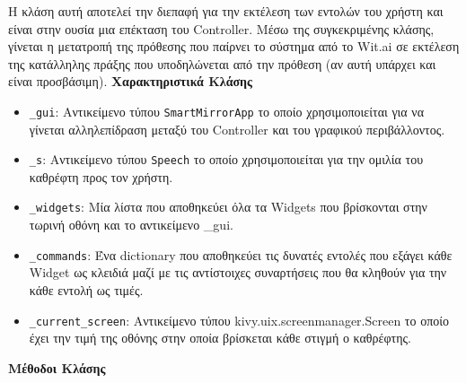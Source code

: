 Η κλάση αυτή αποτελεί την διεπαφή για την εκτέλεση των εντολών του χρήστη και είναι στην ουσία μια επέκταση του Controller. Μέσω της συγκεκριμένης κλάσης, γίνεται η μετατροπή της πρόθεσης που παίρνει το σύστημα από το Wit.ai σε εκτέλεση της κατάλληλης πράξης που υποδηλώνεται από την πρόθεση (αν αυτή υπάρχει και είναι προσβάσιμη).
\newpage
\noindent\textbf{Χαρακτηριστικά Κλάσης}
\begin{itemize}
    \item \texttt{\_gui}: Αντικείμενο τύπου \texttt{SmartMirrorApp} το οποίο χρησιμοποιείται για να γίνεται αλληλεπίδραση μεταξύ του Controller και του γραφικού περιβάλλοντος.
    \item \texttt{\_s}: Αντικείμενο τύπου \texttt{Speech} το οποίο χρησιμοποιείται για την ομιλία του καθρέφτη προς τον χρήστη.
    \item \texttt{\_widgets}: Μία λίστα που αποθηκεύει όλα τα Widgets που βρίσκονται στην τωρινή οθόνη και το αντικείμενο \_gui.
    \item \texttt{\_commands}: Ένα dictionary που αποθηκεύει τις δυνατές εντολές που εξάγει κάθε Widget ως κλειδιά μαζί με τις αντίστοιχες συναρτήσεις που θα κληθούν για την κάθε εντολή ως τιμές.
    \item \texttt{\_current\_screen}: Αντικείμενο τύπου kivy.uix.screenmanager.Screen το οποίο έχει την τιμή της οθόνης στην οποία βρίσκεται κάθε στιγμή ο καθρέφτης.
\end{itemize}
\noindent\textbf{Μέθοδοι Κλάσης}
